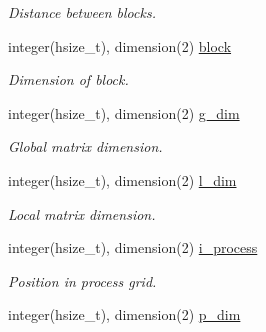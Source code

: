 \begin{DoxyCompactItemize}
\begin{DoxyCompactList}\small\item\em Distance between blocks. \end{DoxyCompactList}\item 
\hypertarget{namespacehdf5__tools_a1bd5d44d2bbdd65cdbf723c7f3520999}{}integer(hsize\+\_\+t), dimension(2) \hyperlink{namespacehdf5__tools_a1bd5d44d2bbdd65cdbf723c7f3520999}{block}\label{namespacehdf5__tools_a1bd5d44d2bbdd65cdbf723c7f3520999}

\begin{DoxyCompactList}\small\item\em Dimension of block. \end{DoxyCompactList}\item 
\hypertarget{namespacehdf5__tools_a25416e691db567713be9f6dca1604585}{}integer(hsize\+\_\+t), dimension(2) \hyperlink{namespacehdf5__tools_a25416e691db567713be9f6dca1604585}{g\+\_\+dim}\label{namespacehdf5__tools_a25416e691db567713be9f6dca1604585}

\begin{DoxyCompactList}\small\item\em Global matrix dimension. \end{DoxyCompactList}\item 
\hypertarget{namespacehdf5__tools_af1f9ebec5f73cc617d7719a72b1d8efb}{}integer(hsize\+\_\+t), dimension(2) \hyperlink{namespacehdf5__tools_af1f9ebec5f73cc617d7719a72b1d8efb}{l\+\_\+dim}\label{namespacehdf5__tools_af1f9ebec5f73cc617d7719a72b1d8efb}

\begin{DoxyCompactList}\small\item\em Local matrix dimension. \end{DoxyCompactList}\item 
\hypertarget{namespacehdf5__tools_aad6060c895e14ba1b6d65e82aa4fc91f}{}integer(hsize\+\_\+t), dimension(2) \hyperlink{namespacehdf5__tools_aad6060c895e14ba1b6d65e82aa4fc91f}{i\+\_\+process}\label{namespacehdf5__tools_aad6060c895e14ba1b6d65e82aa4fc91f}

\begin{DoxyCompactList}\small\item\em Position in process grid. \end{DoxyCompactList}\item 
\hypertarget{namespacehdf5__tools_a5d0d4ba888455ae9819ba16c8ca7be81}{}integer(hsize\+\_\+t), dimension(2) \hyperlink{namespacehdf5__tools_a5d0d4ba888455ae9819ba16c8ca7be81}{p\+\_\+dim}\label{namespacehdf5__tools_a5d0d4ba888455ae9819ba16c8ca7be81}


\end{DoxyCompactItemize}
